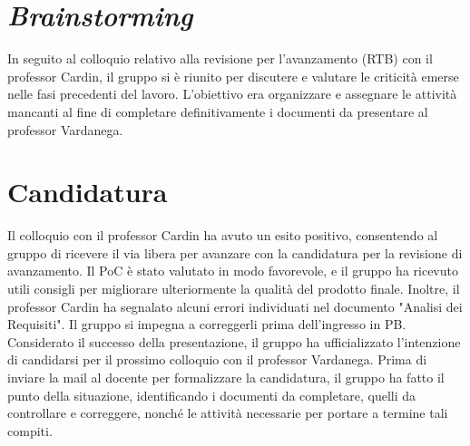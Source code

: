 \section{\textit{Brainstorming}}
In seguito al colloquio relativo alla revisione per l'avanzamento (RTB) con il professor Cardin, il gruppo si è riunito per discutere e valutare le criticità 
emerse nelle fasi precedenti del lavoro. L'obiettivo era organizzare e assegnare le attività mancanti al fine di completare definitivamente i documenti da presentare 
al professor Vardanega.

\section{Candidatura}
Il colloquio con il professor Cardin ha avuto un esito positivo, consentendo al gruppo di ricevere il via libera per avanzare con la candidatura per la revisione di avanzamento.
Il PoC è stato valutato in modo favorevole, e il gruppo ha ricevuto utili consigli per migliorare ulteriormente la qualità del prodotto finale. Inoltre, il professor Cardin ha 
segnalato alcuni errori individuati nel documento "Analisi dei Requisiti". Il gruppo si impegna a correggerli prima dell'ingresso in PB.\\
Considerato il successo della presentazione, il gruppo ha ufficializzato l'intenzione di candidarsi per il prossimo colloquio con il professor Vardanega. 
Prima di inviare la mail al docente per formalizzare la candidatura, il gruppo ha fatto il punto della situazione, identificando i documenti da completare, 
quelli da controllare e correggere, nonché le attività necessarie per portare a termine tali compiti.